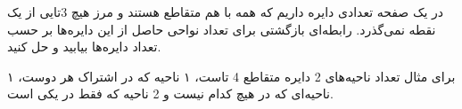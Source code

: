 \p 
    در یک صفحه تعدادی دایره داریم که
     همه با هم متقاطع هستند و مرز هیچ $ 3 $تایی از یک نقطه نمی‌گذرد. رابطه‌ای بازگشتی برای تعداد نواحی حاصل از این دایره‌ها بر حسب تعداد دایره‌ها بیابید و حل کنید.
     
    برای مثال تعداد ناحیه‌های 2 دایره متقاطع 4 تاست، ۱ ناحیه که در اشتراک هر دوست، ۱ ناحیه‌ای که در هیچ کدام نیست و 2 ناحیه که فقط در یکی است.
